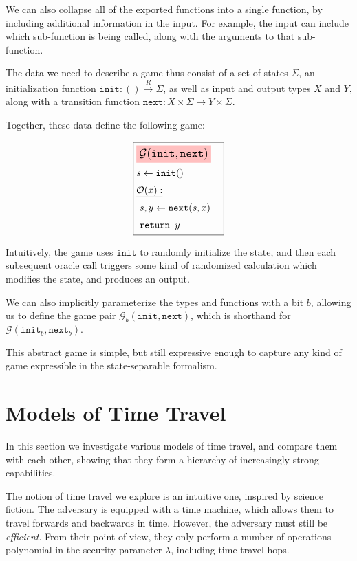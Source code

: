 We can also collapse all of the exported functions into a single function,
by including additional information in the input.
For example, the input can include which sub-function is being called,
along with the arguments to that sub-function.

The data we need to describe a game thus consist of a set of states
$\Sigma$, an initialization function $\texttt{init} : () \xrightarrow{R} \Sigma$,
as well as input and output types $X$ and $Y$, along with
a transition function ${\texttt{next} : X \times \Sigma \to Y \times \Sigma}$.

Together, these data define the following game:

\begin{game}
\captionsetup{justification=centering}
$$
\boxed{
\begin{aligned}
&\colorbox{pink}{\large $\mathcal{G}(\texttt{init}, \texttt{next})$}\cr
&s \gets \texttt{init}()\cr
&\underline{\mathcal{O}(x):}\cr
&\ s, y \gets \texttt{next}(s, x)\cr
&\ \texttt{return } y
\end{aligned}
}
$$
\caption{$\mathcal{G}(\texttt{init}, \texttt{next})$}
\end{game}

Intuitively, the game uses $\texttt{init}$ to randomly initialize the state, and
then each subsequent oracle call triggers some kind of randomized calculation
which modifies the state, and produces an output.

We can also implicitly parameterize the types and functions with a bit $b$,
allowing us to define the game pair $\mathcal{G}_b(\texttt{init}, \texttt{next})$,
which is shorthand for $\mathcal{G}(\texttt{init}_b, \texttt{next}_b)$.

This abstract game is simple, but still expressive enough to capture any
kind of game expressible in the state-separable formalism.

\section{Models of Time Travel}
\label{sec:model}

In this section we investigate various models of time travel, and compare
them with each other, showing that they form a hierarchy of increasingly
strong capabilities.

The notion of time travel we explore is an intuitive one, inspired by
science fiction.
The adversary is equipped with a time machine, which allows them
to travel forwards and backwards in time.
However, the adversary must still be \emph{efficient}.
From their point of view, they only perform a number of operations
polynomial in the security parameter $\lambda$, including time travel
hops.

